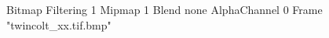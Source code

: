 {Bitmap
	{Filtering 1}
	{Mipmap 1}
	{Blend none}
	{AlphaChannel 0}
	{Frame "twincolt_xx.tif.bmp"}
}
